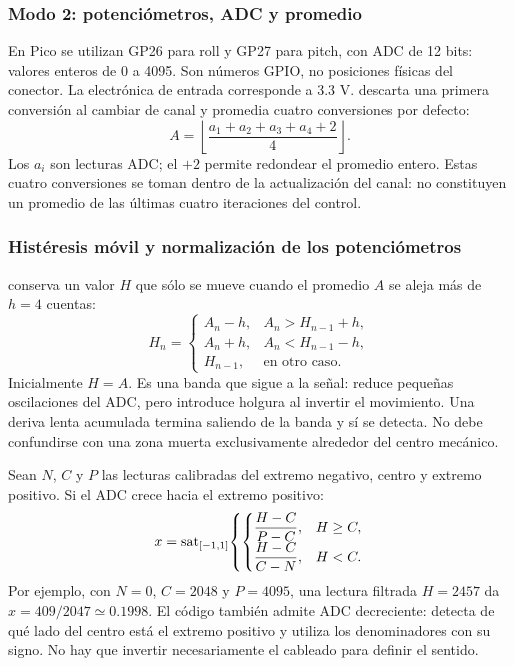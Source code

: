 \subsubsection{Modo 2: potenciómetros, ADC y promedio}
En Pico se utilizan GP26 para roll y GP27 para pitch, con ADC de 12 bits: valores enteros de 0 a 4095. Son números GPIO, no posiciones físicas del conector. La electrónica de entrada corresponde a 3.3 V.  descarta una primera conversión al cambiar de canal y promedia cuatro conversiones por defecto:
\begin{equation}
A=\left\lfloor\frac{a_1+a_2+a_3+a_4+2}{4}\right\rfloor.
\end{equation}
Los $a_i$ son lecturas ADC; el $+2$ permite redondear el promedio entero. Estas cuatro conversiones se toman dentro de la actualización del canal: no constituyen un promedio de las últimas cuatro iteraciones del control.

\subsubsection{Histéresis móvil y normalización de los potenciómetros}
 conserva un valor $H$ que sólo se mueve cuando el promedio $A$ se aleja más de $h=4$ cuentas:
\begin{equation}
H_n=\begin{cases}
A_n-h,&A_n>H_{n-1}+h,\\
A_n+h,&A_n<H_{n-1}-h,\\
H_{n-1},&\text{en otro caso}.
\end{cases}
\end{equation}
Inicialmente $H=A$. Es una banda que sigue a la señal: reduce pequeñas oscilaciones del ADC, pero introduce holgura al invertir el movimiento. Una deriva lenta acumulada termina saliendo de la banda y sí se detecta. No debe confundirse con una zona muerta exclusivamente alrededor del centro mecánico.

Sean $N$, $C$ y $P$ las lecturas calibradas del extremo negativo, centro y extremo positivo. Si el ADC crece hacia el extremo positivo:
\begin{equation}
x=\operatorname{sat}_{[-1,1]}\!\left\{\begin{cases}
\dfrac{H-C}{P-C},&H\ge C,\\[3pt]
\dfrac{H-C}{C-N},&H<C.
\end{cases}\right.
\end{equation}
Por ejemplo, con $N=0$, $C=2048$ y $P=4095$, una lectura filtrada $H=2457$ da $x=409/2047\simeq0.1998$. El código también admite ADC decreciente: detecta de qué lado del centro está el extremo positivo y utiliza los denominadores con su signo. No hay que invertir necesariamente el cableado para definir el sentido.

